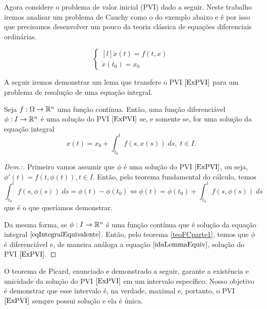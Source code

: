 Agora considere o problema de valor inicial (PVI) dado a seguir. Neste trabalho iremos analisar um problema de Cauchy como o do exemplo abaixo e é por isso que precisamos desenvolver um pouco da teoria clássica de equações diferenciais ordinárias.

\begin{equation}
\label{ExPVI}
    \left\{\begin{matrix*}[l]
        \Dot{x}(t)=f(t,x)\\
        \Dot{x}(t_0)=x_0
    \end{matrix*}\right.
\end{equation}

A seguir iremos demonstrar um lema que transfere o PVI $\eqref{ExPVI}$ para um problema de resolução de uma equação integral.

\begin{lemma}
    \label{lemmaEquivalencia}
    Seja $f:\Omega\to\mathbb{R}^n$ uma função contínua. Então, uma função diferenciável $\phi:I\to\mathbb{R}^n$ é uma solução do PVI $\eqref{ExPVI}$ se, e somente se, for uma solução da equação integral
    \begin{equation}
        \label{eqIntegralEquivalente}
        x(t)=x_0 + \int_{t_0}^t f(s,x(s)) \; ds, \; t\in I.
    \end{equation}
\end{lemma}
\begin{proof}[Dem.:]
    Primeiro vamos assumir que $\phi$ é uma solução do PVI $\eqref{ExPVI}$, ou seja, $\phi'(t)=f(t,\phi(t)),t\in I$. Então, pelo teorema fundamental do cálculo, temos
    \begin{equation}
        \label{idaLemmaEquiv}
        \int_{t_0}^t f(s,\phi(s)) \; ds = \phi(t)-\phi(t_0) \Longleftrightarrow \phi(t) = \phi(t_0) + \int_{t_0}^t f(s,\phi(s)) \; ds
    \end{equation}
    que é o que queríamos demonstrar.
    
    Da mesma forma, se $\phi:I\to\mathbb{R}^n$ é uma função contínua que é solução da equação integral $\eqref{eqIntegralEquivalente}$. Então, pelo teorema \ref{teoFCparte1}, temos que $\phi$ é diferenciável e, de maneira análoga a equação $\eqref{idaLemmaEquiv}$, solução do PVI $\eqref{ExPVI}$.
\end{proof}

O teorema de Picard, enunciado e demonstrado a seguir, garante a existência e unicidade da solução do PVI $\eqref{ExPVI}$ em um intervalo específico. Nosso objetivo é demonstrar que esse intervalo é, na verdade, maximal e, portanto, o PVI $\eqref{ExPVI}$ sempre possui solução e ela é única.

